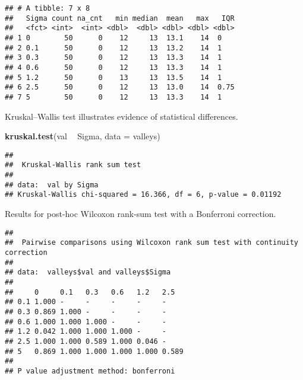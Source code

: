 \documentclass[]{book}
\newenvironment{Shaded}{\begin{snugshade}}{\end{snugshade}}
\newcommand{\DataTypeTok}[1]{\textcolor[rgb]{0.13,0.29,0.53}{#1}}
\newcommand{\KeywordTok}[1]{\textcolor[rgb]{0.13,0.29,0.53}{\textbf{#1}}}
\newcommand{\NormalTok}[1]{#1}
\newcommand{\OperatorTok}[1]{\textcolor[rgb]{0.81,0.36,0.00}{\textbf{#1}}}
\newcommand{\OtherTok}[1]{\textcolor[rgb]{0.56,0.35,0.01}{#1}}
\newcommand{\StringTok}[1]{\textcolor[rgb]{0.31,0.60,0.02}{#1}}
\begin{document}
\begin{verbatim}
## # A tibble: 7 x 8
##   Sigma count na_cnt   min median  mean   max   IQR
##   <fct> <int>  <int> <dbl>  <dbl> <dbl> <dbl> <dbl>
## 1 0        50      0    12     13  13.1    14  0   
## 2 0.1      50      0    12     13  13.2    14  1   
## 3 0.3      50      0    12     13  13.3    14  1   
## 4 0.6      50      0    12     13  13.3    14  1   
## 5 1.2      50      0    13     13  13.5    14  1   
## 6 2.5      50      0    12     13  13.0    14  0.75
## 7 5        50      0    12     13  13.3    14  1
\end{verbatim}

Kruskal--Wallis test illustrates evidence of statistical differences.

\begin{Shaded}
\begin{Highlighting}[]
\KeywordTok{kruskal.test}\NormalTok{(val }\OperatorTok{~}\StringTok{ }\NormalTok{Sigma, }\DataTypeTok{data =}\NormalTok{ valleys)}
\end{Highlighting}
\end{Shaded}

\begin{verbatim}
## 
##  Kruskal-Wallis rank sum test
## 
## data:  val by Sigma
## Kruskal-Wallis chi-squared = 16.366, df = 6, p-value = 0.01192
\end{verbatim}

Results for post-hoc Wilcoxon rank-sum test with a Bonferroni correction.

\begin{Shaded}
\end{Shaded}

\begin{verbatim}
## 
##  Pairwise comparisons using Wilcoxon rank sum test with continuity correction 
## 
## data:  valleys$val and valleys$Sigma 
## 
##     0     0.1   0.3   0.6   1.2   2.5  
## 0.1 1.000 -     -     -     -     -    
## 0.3 0.869 1.000 -     -     -     -    
## 0.6 1.000 1.000 1.000 -     -     -    
## 1.2 0.042 1.000 1.000 1.000 -     -    
## 2.5 1.000 1.000 0.589 1.000 0.046 -    
## 5   0.869 1.000 1.000 1.000 1.000 0.589
## 
## P value adjustment method: bonferroni
\end{verbatim}
\end{document}
